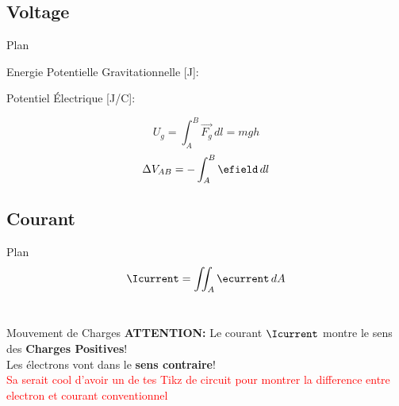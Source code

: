 \subsection[2min - Max]{Voltage}
\begin{frame}{Plan}
    \begin{twocolumns}[0.5]
        \leftcol
            \begin{center}
            Energie Potentielle Gravitationnelle [J]:
            \end{center}
        \rightcol
            \begin{center}
            Potentiel Électrique [J/C]:\\
            \end{center}
    \end{twocolumns}
    \begin{twocolumns}[0.5]
        \leftcol
            \begin{equation}
                U_{g} = \int_{A}^{B}\vec{F_g} \,dl =  mgh
            \end{equation}
        \rightcol
            \begin{equation}
                \Delta V_{AB} = -\int_{A}^{B}\efield \,dl
            \end{equation}
    \end{twocolumns}
    \vspace{-24pt}
    \begin{twocolumns}[0.5]
        \leftcol
        \rightcol
    \end{twocolumns}
    \vfill
\end{frame}

\subsection[2min - Max]{Courant}
\begin{frame}{Plan}
    \begin{equation}
        \Icurrent = \iint_A \ecurrent \,dA
    \end{equation}\\
    \vspace{20pt}
\end{frame}


\begin{frame}{Mouvement de Charges}
    \centering
    \icon[green]{\faExclamationTriangle} \textbf{ATTENTION:} Le courant $\Icurrent$ montre le sens des \textbf{Charges Positives}!\\
    Les électrons vont dans le \textbf{sens contraire}!\\
    \vspace{20pt}
    \textcolor{red}{Sa serait cool d'avoir un de tes Tikz de circuit pour montrer la difference entre electron et courant conventionnel}
\end{frame}

